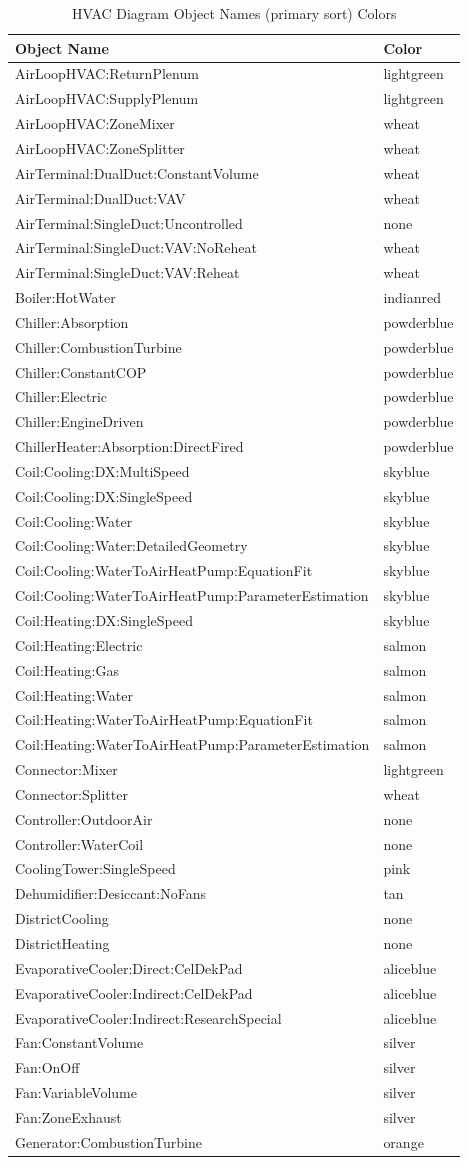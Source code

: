 \begin{longtable}[c]{@{}ll@{}}
\caption{HVAC Diagram Object Names (primary sort) Colors \protect \label{table:hvac-diagram-object-names-primary-sort-colors}}\\
\toprule 
Object Name & Color \tabularnewline \midrule
\endhead
AirLoopHVAC:ReturnPlenum & lightgreen \tabularnewline
AirLoopHVAC:SupplyPlenum & lightgreen \tabularnewline
AirLoopHVAC:ZoneMixer & wheat \tabularnewline
AirLoopHVAC:ZoneSplitter & wheat \tabularnewline
AirTerminal:DualDuct:ConstantVolume & wheat \tabularnewline
AirTerminal:DualDuct:VAV & wheat \tabularnewline
AirTerminal:SingleDuct:Uncontrolled & none \tabularnewline
AirTerminal:SingleDuct:VAV:NoReheat & wheat \tabularnewline
AirTerminal:SingleDuct:VAV:Reheat & wheat \tabularnewline
Boiler:HotWater & indianred \tabularnewline
Chiller:Absorption & powderblue \tabularnewline
Chiller:CombustionTurbine & powderblue \tabularnewline
Chiller:ConstantCOP & powderblue \tabularnewline
Chiller:Electric & powderblue \tabularnewline
Chiller:EngineDriven & powderblue \tabularnewline
ChillerHeater:Absorption:DirectFired & powderblue \tabularnewline
Coil:Cooling:DX:MultiSpeed & skyblue \tabularnewline
Coil:Cooling:DX:SingleSpeed & skyblue \tabularnewline
Coil:Cooling:Water & skyblue \tabularnewline
Coil:Cooling:Water:DetailedGeometry & skyblue \tabularnewline
Coil:Cooling:WaterToAirHeatPump:EquationFit & skyblue \tabularnewline
Coil:Cooling:WaterToAirHeatPump:ParameterEstimation & skyblue \tabularnewline
Coil:Heating:DX:SingleSpeed & skyblue \tabularnewline
Coil:Heating:Electric & salmon \tabularnewline
Coil:Heating:Gas & salmon \tabularnewline
Coil:Heating:Water & salmon \tabularnewline
Coil:Heating:WaterToAirHeatPump:EquationFit & salmon \tabularnewline
Coil:Heating:WaterToAirHeatPump:ParameterEstimation & salmon \tabularnewline
Connector:Mixer & lightgreen \tabularnewline
Connector:Splitter & wheat \tabularnewline
Controller:OutdoorAir & none \tabularnewline
Controller:WaterCoil & none \tabularnewline
CoolingTower:SingleSpeed & pink \tabularnewline
Dehumidifier:Desiccant:NoFans & tan \tabularnewline
DistrictCooling & none \tabularnewline
DistrictHeating & none \tabularnewline
EvaporativeCooler:Direct:CelDekPad & aliceblue \tabularnewline
EvaporativeCooler:Indirect:CelDekPad & aliceblue \tabularnewline
EvaporativeCooler:Indirect:ResearchSpecial & aliceblue \tabularnewline
Fan:ConstantVolume & silver \tabularnewline
Fan:OnOff & silver \tabularnewline
Fan:VariableVolume & silver \tabularnewline
Fan:ZoneExhaust & silver \tabularnewline
Generator:CombustionTurbine & orange \tabularnewline

\end{longtable}
